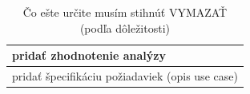 \documentclass[a4paper,slovak,12pt,appendix]{article}
\begin{document}
\begin{table}[H]
  \caption{Čo ešte určite musím stihnúť VYMAZAŤ (podľa dôležitosti)}
  \centering
  \begin{tabular}{|p{}|}
    \hline
    pridať zhodnotenie analýzy      \\ \hline
    pridať špecifikáciu požiadaviek (opis use case)   \\ \hline
  \end{tabular}
\end{table}



\newpage
{}


\end{document}
